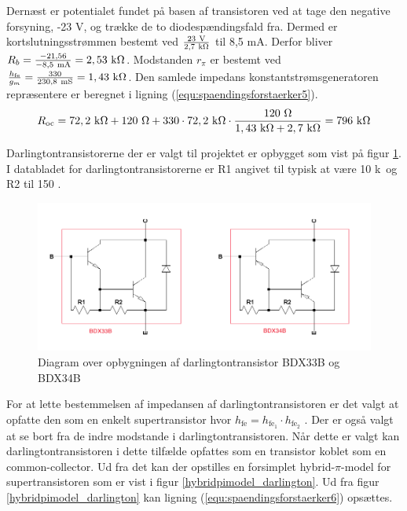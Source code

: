Dernæst er potentialet fundet på basen af transistoren ved at tage den negative forsyning, -23 V, og trække de to diodespændingsfald fra. Dermed er kortslutningsstrømmen bestemt ved $\frac{23~\mathrm{V}}{2,7~\mathrm{k}\ohm}$ til 8,5 mA. Derfor bliver $R_b = \frac{-21,56}{-8,5~\mathrm{mA}} = 2,53~\mathrm{k}\ohm$. Modstanden $r_{\pi}$ er bestemt ved $\frac{h_{\mathrm{fe}}}{g_m} = \frac{330}{230,8~\mathrm{mS}} = 1,43~\mathrm{k}\ohm$. Den samlede impedans konstantstrømsgeneratoren repræsentere er beregnet i ligning (\ref{equ:spaendingsforstaerker5}). 
\begin{equation}
\label{equ:spaendingsforstaerker5}
R_{\mathrm{oc}} = 72,2~\mathrm{k}\ohm + 120~\ohm + 330 \cdot 72,2~\mathrm{k}\ohm \cdot \frac{120~\ohm}{1,43~\mathrm{k}\ohm + 2,7~\mathrm{k}\ohm} = 796~\mathrm{k}\ohm
\end{equation}


Darlingtontransistorerne der er valgt til projektet er opbygget som vist på figur \ref{darlington_diagram}. I databladet for darlingtontransistorerne \cite{bdx33-34-datablad} er R1 angivet til typisk at være 10 k\ohm~og R2 til 150 \ohm.

\begin{figure}[h]
\centering
\includegraphics[scale = 0.4]{teknisk/effektforstaerker/darlingtontransistor_opbygning.png}
\caption{Diagram over opbygningen af darlingtontransistor BDX33B og BDX34B}
\label{darlington_diagram}
\end{figure}

For at lette bestemmelsen af impedansen af darlingtontransistoren er det valgt at opfatte den som en enkelt supertransistor hvor $h_{\mathrm{fe}}= h_{\mathrm{fe}_1} \cdot h_{\mathrm{fe}_2}$ \cite{sedra-smith-1}. %
Der er også valgt at se bort fra de indre modstande i darlingtontransistoren. Når dette er valgt kan darlingtontransistoren i dette tilfælde opfattes som en transistor koblet som en common-collector. Ud fra det kan der opstilles en forsimplet hybrid-$\pi$-model for supertransistoren som er vist i figur \ref{hybridpimodel_darlington}. Ud fra figur \ref{hybridpimodel_darlington} kan ligning (\ref{equ:spaendingsforstaerker6}) opsættes.


